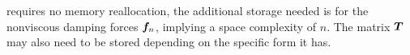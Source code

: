  requires no memory reallocation, the additional storage needed is for the nonviscous damping forces $\bm{f}_n$, implying a space complexity of $n$. The matrix $\bm{T}$ may also need to be stored depending on the specific form it has.
